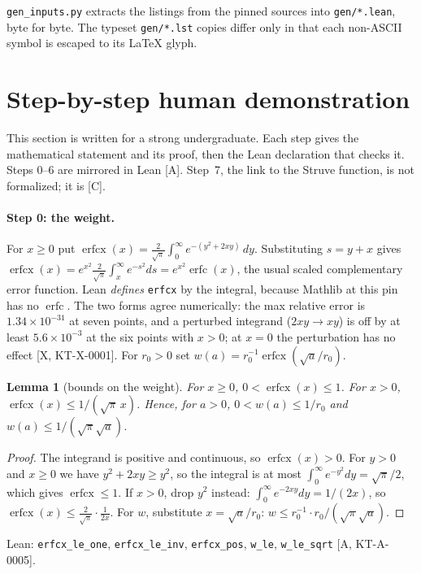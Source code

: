 \documentclass[11pt]{article}
\newtheorem{lemma}[theorem]{Lemma}
\theoremstyle{remark}
\newcommand{\tier}[1]{\textsf{[#1]}}
\newcommand{\erfcx}{\operatorname{erfcx}}
\newcommand{\lean}[1]{\texttt{#1}}
\begin{document}

\texttt{gen\_inputs.py} extracts the listings from the pinned sources into \texttt{gen/*.lean}, byte for byte. The
typeset \texttt{gen/*.lst} copies differ only in that each non-ASCII symbol is escaped to its LaTeX glyph.

\section{Step-by-step human demonstration}\label{sec:human}
This section is written for a strong undergraduate. Each step gives the mathematical statement and its proof, then the
Lean declaration that checks it. Steps 0--6 are mirrored in Lean \tier{A}. Step~7, the link to the Struve function, is
not formalized; it is \tier{C}.

\paragraph{Step 0: the weight.} For $x\ge0$ put
$\erfcx(x)=\frac{2}{\sqrt\pi}\int_0^\infty e^{-(y^2+2xy)}\,dy$. Substituting $s=y+x$ gives
$\erfcx(x)=e^{x^2}\frac{2}{\sqrt\pi}\int_x^\infty e^{-s^2}ds=e^{x^2}\operatorname{erfc}(x)$, the usual scaled
complementary error function. Lean \emph{defines} \lean{erfcx} by the integral, because Mathlib at this pin has no
$\operatorname{erfc}$. The two forms agree numerically: the max relative error is $1.34\times10^{-31}$ at seven points,
and a perturbed integrand ($2xy\to xy$) is off by at least $5.6\times10^{-3}$ at the six points with $x>0$; at $x=0$
the perturbation has no effect \tier{X, KT-X-0001}. For $r_0>0$ set
$w(a)=r_0^{-1}\erfcx(\sqrt a/r_0)$.

\begin{lemma}[bounds on the weight]\label{lem:w}
For $x\ge0$, $0<\erfcx(x)\le1$. For $x>0$, $\erfcx(x)\le 1/(\sqrt\pi\,x)$. Hence, for $a>0$,
$0<w(a)\le 1/r_0$ and $w(a)\le 1/(\sqrt\pi\sqrt a)$.
\end{lemma}
\begin{proof}
The integrand is positive and continuous, so $\erfcx(x)>0$. For $y>0$ and $x\ge0$ we have $y^2+2xy\ge y^2$, so the
integral is at most $\int_0^\infty e^{-y^2}dy=\sqrt\pi/2$, which gives $\erfcx\le1$. If $x>0$, drop $y^2$ instead:
$\int_0^\infty e^{-2xy}dy=1/(2x)$, so $\erfcx(x)\le\frac{2}{\sqrt\pi}\cdot\frac1{2x}$. For $w$, substitute
$x=\sqrt a/r_0$: $w\le r_0^{-1}\cdot r_0/(\sqrt\pi\sqrt a)$.
\end{proof}
\noindent Lean: \lean{erfcx\_le\_one}, \lean{erfcx\_le\_inv}, \lean{erfcx\_pos}, \lean{w\_le}, \lean{w\_le\_sqrt}
\tier{A, KT-A-0005}.
\end{document}
